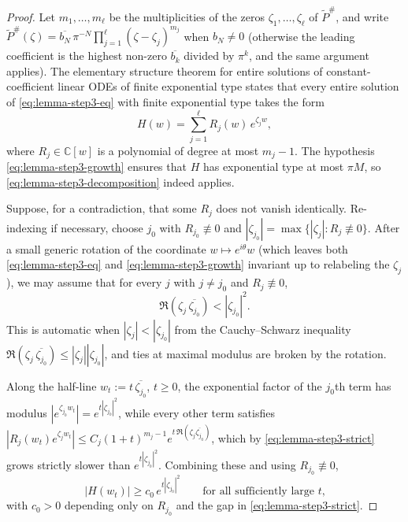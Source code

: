 \documentclass[a4paper,11pt,reqno]{amsart}
\numberwithin{equation}{section}
\theoremstyle{plain} %
\theoremstyle{definition} %
\theoremstyle{remark}
\newcommand{\C}{\mathbb{C}}
\begin{document}
\begin{proof}
Let $m_1,\dots,m_\ell$ be the multiplicities of the zeros
$\zeta_1,\dots,\zeta_\ell$ of $\widetilde P^\#$, and write
\(\widetilde P^\#(\zeta)=\overline{b_N}\,\pi^{-N}\prod_{j=1}^\ell(\zeta-\zeta_j)^{m_j}\)
when $b_N\neq0$ (otherwise the leading coefficient is the highest non-zero
$\overline{b_k}$ divided by $\pi^k$, and the same argument applies). The
elementary structure theorem for entire solutions of constant-coefficient
linear ODEs of finite exponential type \cite[Ch.~XII]{Hormander} states that
every entire solution of \eqref{eq:lemma-step3-eq} with finite exponential
type takes the form
\begin{equation}\label{eq:lemma-step3-decomposition}
H(w)=\sum_{j=1}^\ell R_j(w)\,e^{\zeta_j w},
\end{equation}
where \(R_j\in\C[w]\) is a polynomial of degree at most \(m_j-1\). The
hypothesis \eqref{eq:lemma-step3-growth} ensures that \(H\) has exponential
type at most \(\pi M\), so \eqref{eq:lemma-step3-decomposition} indeed
applies.

Suppose, for a contradiction, that some $R_j$ does not vanish identically.
Re-indexing if necessary, choose $j_0$ with $R_{j_0}\not\equiv0$ and
$|\zeta_{j_0}|=\max\{|\zeta_j|\colon R_j\not\equiv 0\}$. After a small
generic rotation of the coordinate $w\mapsto e^{i\theta}w$ (which leaves both
\eqref{eq:lemma-step3-eq} and \eqref{eq:lemma-step3-growth} invariant up to
relabeling the $\zeta_j$), we may assume that for every \(j\) with
$j\ne j_0$ and $R_j\not\equiv 0$,
\begin{equation}\label{eq:lemma-step3-strict}
\Re(\zeta_j\,\overline{\zeta_{j_0}})<|\zeta_{j_0}|^2.
\end{equation}
This is automatic when $|\zeta_j|<|\zeta_{j_0}|$ from the Cauchy--Schwarz
inequality $\Re(\zeta_j\,\overline{\zeta_{j_0}})\le|\zeta_j||\zeta_{j_0}|$,
and ties at maximal modulus are broken by the rotation.

Along the half-line \(w_t:=t\,\overline{\zeta_{j_0}}\), \(t\ge 0\), the
exponential factor of the \(j_0\)th term has modulus
$|e^{\zeta_{j_0}w_t}|=e^{t|\zeta_{j_0}|^2}$, while every other term
satisfies
\(|R_j(w_t)e^{\zeta_j w_t}|\le C_j(1+t)^{m_j-1}e^{t\,\Re(\zeta_j\overline{\zeta_{j_0}})}\),
which by \eqref{eq:lemma-step3-strict} grows strictly slower than
$e^{t|\zeta_{j_0}|^2}$. Combining these and using $R_{j_0}\not\equiv 0$,
\begin{equation}\label{eq:lemma-step3-lower}
|H(w_t)|\ge c_0\,e^{t|\zeta_{j_0}|^2}
\qquad
\text{for all sufficiently large $t$,}
\end{equation}
with $c_0>0$ depending only on $R_{j_0}$ and the gap in
\eqref{eq:lemma-step3-strict}.


\end{proof}
\end{document}

